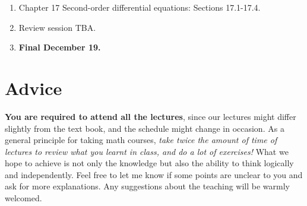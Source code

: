 \documentclass[margin,line]{res}
\newenvironment{list2}{
  \begin{list}{$\bullet$}{%
      \setlength{\itemsep}{0in}
      \setlength{\parsep}{0in} \setlength{\parskip}{0in}
      \setlength{\topsep}{0in} \setlength{\partopsep}{0in}
      \setlength{\leftmargin}{0.2in}}}{\end{list}}
\begin{document}
\begin{resume}
\begin{enumerate}
\item Chapter 17 Second-order differential equations: Sections 17.1-17.4.
\item Review session TBA.
\item {\bf Final December 19.}
\end{enumerate}

\section{\sc Advice}
{\bf You are required to attend all the lectures}, since our
lectures might differ slightly from the text book, and the
schedule might change in occasion. As a general principle for
taking math courses, \emph{take twice the amount of time of lectures
to review what you learnt in class, and do a lot of exercises!} What
we hope to achieve is not only the knowledge but also the ability
to think logically and independently. Feel free to let me know if
some points are unclear to you and ask for more explanations. Any
suggestions about the teaching will be warmly welcomed.


\end{resume}
\end{document}
